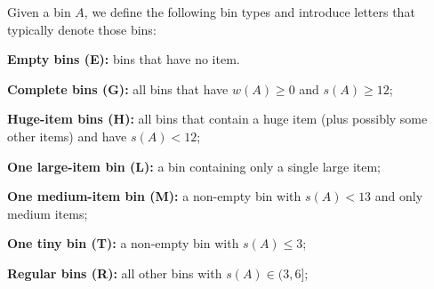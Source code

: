 \begin{dfn}\label{d:types}
Given a bin $A$, we define the following bin types and introduce
letters that typically denote those bins:

\begin{compactitem}
\item 
{\bf Empty bins (E):} bins that have no item.
\item 
{\bf Complete bins (G):} all bins that have $w(A)\geq 0$ and $s(A)\geq
12$;
\item 
{\bf Huge-item bins (H):} all bins that contain a huge item (plus possibly some other items) and have $s(A)<12$;
\item 
{\bf One large-item bin (L):} a bin containing only a single large
item;
\item 
{\bf One medium-item bin (M):} a non-empty bin with $s(A)<13$ and only medium
items;
\item 
{\bf One tiny bin (T):} a non-empty bin with $s(A)\leq3$;
\item 
{\bf Regular bins (R):} all other bins with $s(A)\in(3,6]$;
\end{compactitem}
\end{dfn}

